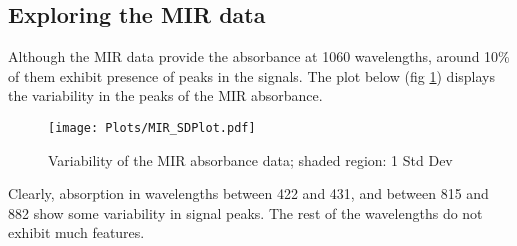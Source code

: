 \subsection*{Exploring the MIR data}
Although the MIR data provide the absorbance at 1060 wavelengths, around 10\% of them exhibit presence of peaks in the signals. The plot below (fig \ref{fig:mir}) displays the variability in the peaks of the MIR absorbance.
\begin{figure}[H]
\begin{center}
\texttt{[image: Plots/MIR\_SDPlot.pdf]}
\end{center}
\caption{Variability of the MIR absorbance data; shaded region: 1 Std Dev}
\label{fig:mir}
\end{figure}
Clearly, absorption in wavelengths between 422 and 431, and between 815 and 882 show some variability in signal peaks. The rest of the wavelengths do not exhibit much features. 

